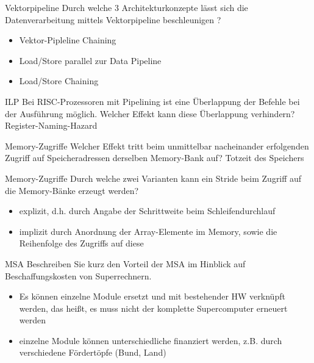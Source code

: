 \begin{aufgabe}{Vektorpipeline}
    Durch welche 3 Architekturkonzepte lässt sich die Datenverarbeitung mittels Vektorpipeline beschleunigen ?
    \tcblower
    \begin{itemize}
        \item Vektor-Pipleline Chaining
        \item Load/Store parallel zur Data Pipeline
        \item Load/Store Chaining
    \end{itemize}
\end{aufgabe}

\begin{aufgabe}[Pipelining]{ILP}
    Bei RISC-Prozessoren mit Pipelining ist eine Überlappung der Befehle bei der Ausführung möglich.
    Welcher Effekt kann diese Überlappung verhindern?
    \tcblower
    Register-Naming-Hazard
\end{aufgabe}

\begin{aufgabe}[Vektorpipeline]{Memory-Zugriffe}
    Welcher Effekt tritt beim unmittelbar nacheinander erfolgenden Zugriff auf Speicheradressen derselben Memory-Bank auf?
    \tcblower
    Totzeit des Speichers
\end{aufgabe}

\begin{aufgabe}[Vektorpipeline]{Memory-Zugriffe}
    Durch welche zwei Varianten kann ein Stride beim Zugriff auf die Memory-Bänke erzeugt werden?
    \tcblower
    \begin{itemize}
        \item explizit, d.h. durch Angabe der Schrittweite beim Schleifendurchlauf
        \item implizit durch Anordnung der Array-Elemente im Memory,
              sowie die Reihenfolge des Zugriffs auf diese
    \end{itemize}
\end{aufgabe}

\begin{aufgabe}{MSA}
    Beschreiben Sie kurz den Vorteil der MSA im Hinblick auf Beschaffungskosten von Superrechnern.
    \tcblower
    \begin{itemize}
        \item Es können einzelne Module ersetzt und mit bestehender HW verknüpft werden,
              das heißt,
              es muss nicht der komplette Supercomputer erneuert werden
        \item einzelne Module können unterschiedliche finanziert werden,
              z.B. durch verschiedene Fördertöpfe (Bund, Land)
    \end{itemize}
\end{aufgabe}